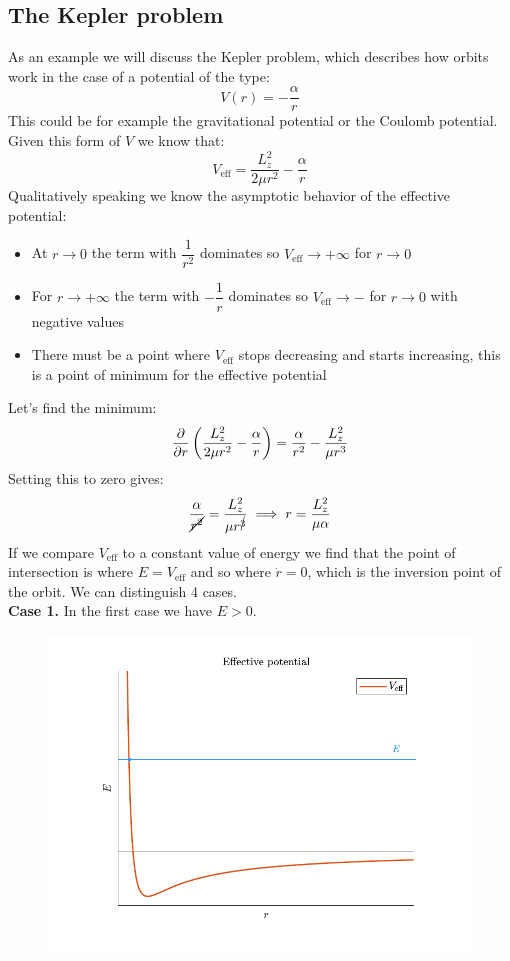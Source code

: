 \subsection{The Kepler problem}
As an example we will discuss the Kepler problem, which describes how orbits work in the case of a potential of the type:
\begin{equation}
    V(r) = -\dfrac{\alpha}{r}
\end{equation}
This could be for example the gravitational potential or the Coulomb potential. Given this form of $V$ we know that:
\begin{equation}
    V_{\text{eff}} = \dfrac{L_z^2}{2 \mu r^2} - \dfrac{\alpha}{r}
\end{equation}
Qualitatively speaking we know the asymptotic behavior of the effective potential:
\begin{itemize}
    \item At $r \rightarrow 0$ the term with $\dfrac{1}{r^2}$ dominates so $V_{\text{eff}} \rightarrow +\infty$ for $r \rightarrow 0$
    \item For $r \rightarrow +\infty$ the term with $-\dfrac{1}{r}$ dominates so $V_{\text{eff}} \rightarrow -$ for $r \rightarrow 0$ with negative values
    \item There must be a point where $V_{\text{eff}}$ stops decreasing and starts increasing, this is a point of minimum for the effective potential
\end{itemize}
\begin{figure}[H]
  \centering
  
\end{figure}
Let's find the minimum:
\begin{equation}
  \pdv{}{r}\brackets{\dfrac{L_z^2}{2 \mu r^2} - \dfrac{\alpha}{r}} =  \dfrac{\alpha}{r^2} -\dfrac{L_z^2}{\mu r^3}
\end{equation}
Setting this to zero gives:
\begin{equation}
  \dfrac{\alpha}{\cancel{r^2}} =\dfrac{L_z^2}{\mu r^{\cancel{3}}} \implies r = \dfrac{L_z^2}{\mu \alpha}
\end{equation}
If we compare $V_{\text{eff}}$ to a constant value of energy we find that the point of intersection is where $E = V_{\text{eff}}$ and so where $\dot{r} = 0$, which is the inversion point of the orbit. We can distinguish 4 cases.\\
\textbf{Case 1.} In the first case we have $E > 0$.
\begin{figure}[H]
  \centering
  \includegraphics[width=0.6\linewidth]{res/svg/hyperbolic_orbit.drawio}
\end{figure}

